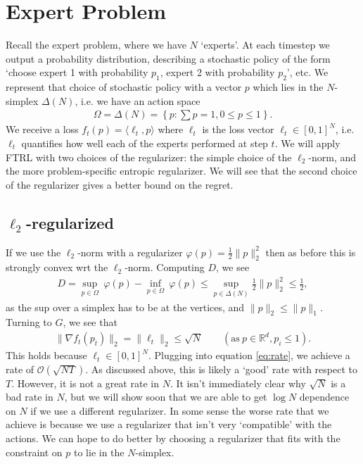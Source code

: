 \documentclass[11pt]{article}
\begin{document}
\section{Expert Problem}
Recall the expert problem, where we have \(N\) `experts'. At each timestep we output a probability distribution, describing a stochastic policy of the form `choose expert 1 with probability \(p_1\), expert 2 with probability \(p_2\)', etc. We represent that choice of stochastic policy with a vector \(p\) which lies in the \(N\)-simplex \(\Delta(N)\), i.e. we have an action space
\begin{align}
    \Omega =  \Delta(N) = \left\{p: \sum p = 1, 0 \leq p \leq 1\right\}.
\end{align}
We receive a loss \(f_t(p) =  \langle \ell_t, p\rangle\) where \(\ell_t\) is the loss vector \(\ell_t \in [0, 1]^N\), i.e. \(\ell_t\) quantifies how well each of the experts performed at step \(t\). We will apply FTRL with two choices of the regularizer: the simple choice of the \(\ell_2\)-norm, and the more problem-specific entropic regularizer. We will see that the second choice of the regularizer gives a better bound on the regret.

\subsection{\(\ell_2\)-regularized}
If we use the \(\ell_2\)-norm with a regularizer \(\varphi(p) = \tfrac{1}{2}\|p\|_2^2\) then as before this is strongly convex wrt the \(\ell_2\)-norm. Computing \(D\), we see
\begin{align}
    D = \underset{p \in \Omega}{\sup}\ \varphi(p) - \underset{p \in \Omega}{\inf}\ \varphi(p) \leq \underset{p \in \Delta(N)}{\sup}\tfrac{1}{2}\|p\|_2^2 \leq \frac{1}{2},
\end{align}
as the sup over a simplex has to be at the vertices, and \(\|p\|_2 \leq \|p\|_1\). Turning to \(G\), we see that 
\begin{align}
    \|\nabla f_t(p_t)\|_2 = \|\ell_t\|_2 \leq \sqrt{N} \qquad (\text{as} \ p \in \mathbb{R}^d, p_i \leq 1).
\end{align}
This holds because $\ell_t \in [0, 1]^N$. Plugging into equation \ref{eq:rate}, we achieve a rate of \(\mathcal{O}(\sqrt{NT})\). As discussed above, this is likely a `good' rate with respect to \(T\). However, it is not a great rate in \(N\). It isn't immediately clear why \(\sqrt{N}\) is a bad rate in \(N\), but we will show soon that we are able to get \(\log N\) dependence on \(N\) if we use a different regularizer. In some sense the worse rate that we achieve is because we use a regularizer that isn't very `compatible' with the actions. We can hope to do better by choosing a regularizer that fits with the constraint on \(p\) to lie in the \(N\)-simplex.
\end{document}
